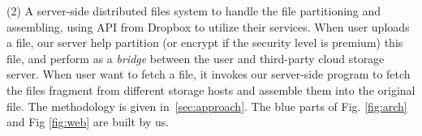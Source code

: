 (2) A server-side distributed files system to handle the file partitioning and assembling, using API from
Dropbox to utilize their services. 
When user uploads a file, our server help partition (or encrypt if the security level is premium) this file, and perform as a \emph{bridge} between
the user and third-party cloud storage server. %
When user want to fetch a file, it invokes our server-side program to fetch the files fragment from different storage hosts and assemble them into the original file.
The methodology is given in~\ref{sec:approach}.
The blue parts of Fig. \ref{fig:arch} and Fig \ref{fig:web} are built by us.

 
